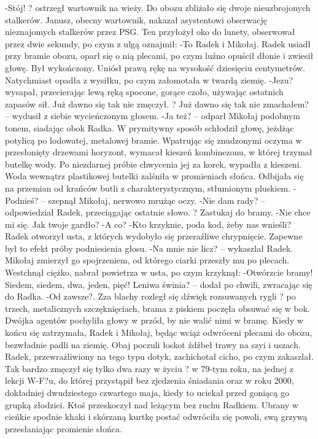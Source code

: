 \documentclass[../MAIN.tex]{subfiles}
\begin{document}
-Stój! ? ostrzegł wartownik na wieży. Do obozu zbliżało się dwoje nieuzbrojonych stalkerów. Janusz, obecny wartownik, nakazał asystentowi obserwację nieznajomych stalkerów przez PSG. Ten przyłożył oko do lunety, obserwował przez dwie sekundy, po czym z ulgą oznajmił:
-To Radek i Mikołaj.
Radek usiadł przy bramie obozu, oparł się o nią plecami, po czym luźno opuścił dłonie i zwiesił głowę. Był wykończony. Uniósł prawą rękę na wysokość dziesięciu centymetrów.
Natychmiast opadła z wysiłku, po czym załomotała w twardą ziemię.
-Jezu? wysapał, przecierając lewą ręką spocone, gorące czoło, używając ostatnich zapasów sił. Już dawno się tak nie zmęczył. ? Już dawno się tak nie zmachałem? -- wydusił z siebie wycieńczonym głosem.
-Ja też? -- odparł Mikołaj podobnym tonem, siadając obok Radka. W prymitywny sposób schłodził głowę, jeżdżąc potylicą po lodowatej, metalowej bramie. Wpatrując się znudzonymi oczyma w przesłonięty drzewami horyzont, wymacał kieszeń kombinezonu, w której trzymał butelkę wody.
Po niezdarnej próbie chwycenia jej za korek, wypadła z kieszeni. Woda wewnątrz plastikowej butelki zalśniła w promieniach słońca. Odbijała się na przemian od krańców butli z charakterystycznym, stłumionym pluskiem.
-Podnieś? -- szepnął Mikołaj, nerwowo mrużąc oczy.
-Nie dam rady? -- odpowiedział Radek, przeciągając ostatnie słowo. ? Zastukaj do bramy.
-Nie chce mi się. Jak twoje gardło?
-A co?
-Kto krzyknie, poda kod, żeby nas wnieśli?
Radek otworzył usta, z których wydobyło się przeraźliwe chrypnięcie. Zapewne był to efekt próby podniesienia głosu.
-Na mnie nie licz? -- wykaszlał Radek. Mikołaj zmierzył go spojrzeniem, od którego ciarki przeszły mu po plecach. Westchnął ciężko, nabrał powietrza w usta, po czym krzyknął:
-Otwórzcie bramy! Siedem, siedem, dwa, jeden, pięć! Leniwa świnia? -- dodał po chwili, zwracając się do Radka.
-Od zawsze?.
Zza blachy rozległ się dźwięk rozsuwanych rygli ? po trzech, metalicznych szczęknięciach, brama z piskiem poczęła obsuwać się w bok. Dwójka agentów pochyliła głowy w przód, by nie walić nimi w bramę. Kiedy w końcu się zatrzymała, Radek i Mikołaj, będąc wciąż odwróceni plecami do obozu, bezwładnie padli na ziemię. Obaj poczuli łoskot źdźbeł trawy na szyi i uszach. Radek, przewrażliwiony na tego typu dotyk, zachichotał cicho, po czym zakaszlał. Tak bardzo zmęczył się tylko dwa razy w życiu ? w 79-tym roku, na jednej z lekcji W-F?u, do której przystąpił bez zjedzenia śniadania oraz w roku 2000, dokładniej dwudziestego czwartego maja, kiedy to uciekał przed goniącą go grupką złodziei.
Ktoś przeskoczył nad leżącym bez ruchu Radkiem. Ubrany w cieńkie spodnie khaki i skórzaną kurtkę postać odwróciła się powoli, swą grzywą przesłaniając promienie słońca.
\end{document}

